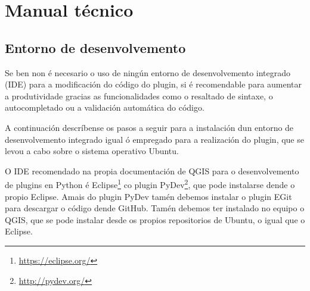 \chapter{Manual técnico}
\section{Entorno de desenvolvemento}
Se ben non é necesario o uso de ningún entorno de desenvolvemento integrado (IDE) para a modificación do código do plugin, si é recomendable para aumentar a produtividade gracias as funcionalidades como o resaltado de sintaxe, o autocompletado ou a validación automática do código.

A continuación descríbense os pasos a seguir para a instalación dun entorno de desenvolvemento integrado igual ó empregado para a realización do plugin, que se levou a cabo sobre o sistema operativo Ubuntu.

O IDE recomendado na propia documentación de QGIS para o desenvolvemento de plugins en Python é Eclipse\footnote{\url{https://eclipse.org/}} co plugin PyDev\footnote{\url{http://pydev.org/}}, que pode instalarse dende o propio Eclipse. Amais do plugin PyDev tamén debemos instalar o plugin EGit para descargar o código dende GitHub. Tamén debemos ter instalado no equipo o QGIS, que se pode instalar desde os propios repositorios de Ubuntu, o igual que o Eclipse.

